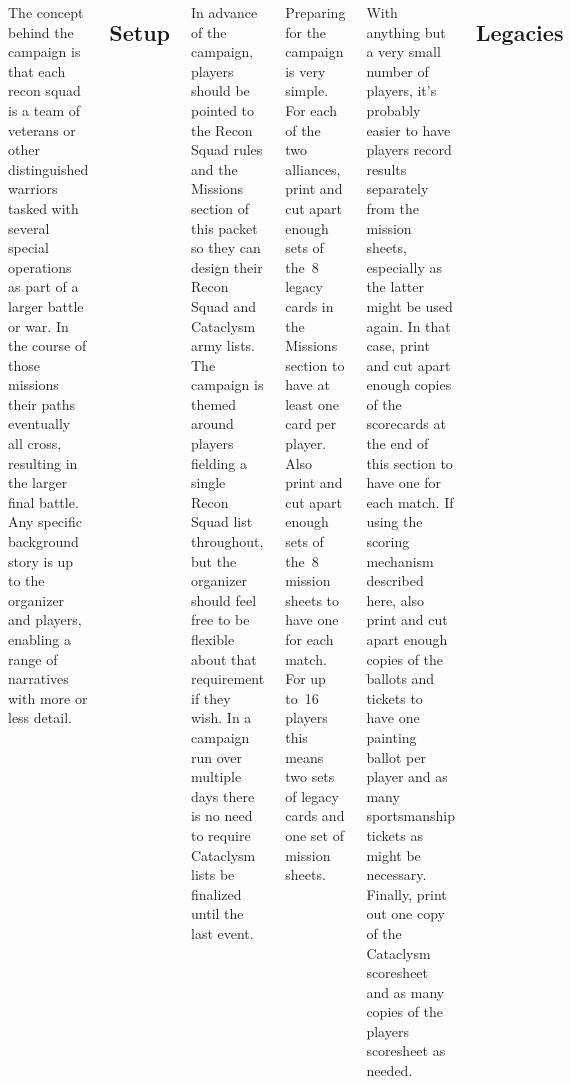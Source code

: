 \begin{columns}
The concept behind the campaign is that each recon squad is a team of
veterans or other distinguished warriors tasked with several special
operations as part of a larger battle or war.  In the course of those
missions their paths eventually all cross, resulting in the larger
final battle.  Any specific background story is up to the organizer
and players, enabling a range of narratives with more or less detail.

\subsection{Setup}

In advance of the campaign, players should be pointed to the Recon
Squad rules and the Missions section of this packet so they can design
their Recon Squad and Cataclysm army lists.  The campaign is themed
around players fielding a single Recon Squad list throughout, but the
organizer should feel free to be flexible about that requirement if
they wish.  In a campaign run over multiple days there is no need to
require Cataclysm lists be finalized until the last event.

Preparing for the campaign is very simple.  For each of the two
alliances, print and cut apart enough sets of the~8 legacy cards in
the Missions section to have at least one card per player.  Also print
and cut apart enough sets of the~8 mission sheets to have one for each
match.  For up to~16 players this means two sets of legacy cards and
one set of mission sheets.

With anything but a very small number of players, it's probably easier
to have players record results separately from the mission sheets,
especially as the latter might be used again.  In that case, print and
cut apart enough copies of the scorecards at the end of this section
to have one for each match.  If using the scoring mechanism described
here, also print and cut apart enough copies of the ballots and
tickets to have one painting ballot per player and as many
sportsmanship tickets as might be necessary. Finally, print out one
copy of the Cataclysm scoresheet and as many copies of the players
scoresheet as needed.


\subsection{Legacies}


\end{columns}

